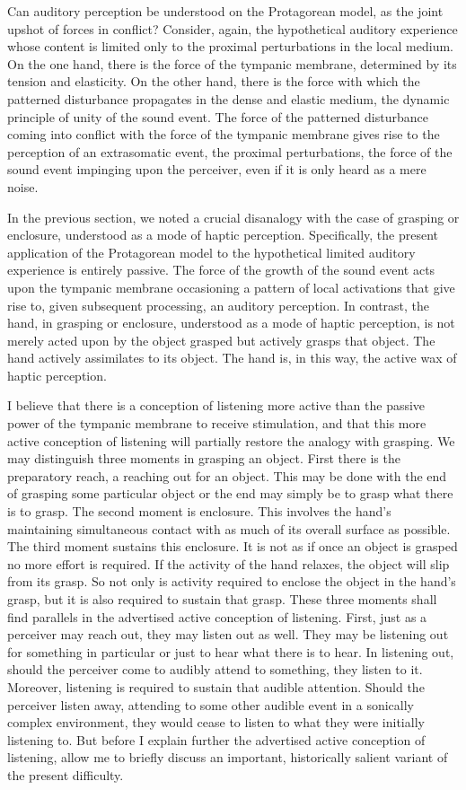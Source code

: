 Can auditory perception be understood on the Protagorean model, as the joint upshot of forces in conflict? Consider, again, the hypothetical auditory experience whose content is limited only to the proximal perturbations in the local medium. On the one hand, there is the force of the tympanic membrane, determined by its tension and elasticity. On the other hand, there is the force with which the patterned disturbance propagates in the dense and elastic medium, the dynamic principle of unity of the sound event. The force of the patterned disturbance coming into conflict with the force of the tympanic membrane gives rise to the perception of an extrasomatic event, the proximal perturbations, the force of the sound event impinging upon the perceiver, even if it is only heard as a mere noise.

In the previous section, we noted a crucial disanalogy with the case of grasping or enclosure, understood as a mode of haptic perception. Specifically, the present application of the Protagorean model to the hypothetical limited auditory experience is entirely passive. The force of the growth of the sound event acts upon the tympanic membrane occasioning a pattern of local activations that give rise to, given subsequent processing, an auditory perception. In contrast, the hand, in grasping or enclosure, understood as a mode of haptic perception, is not merely acted upon by the object grasped but actively grasps that object. The hand actively assimilates to its object. The hand is, in this way, the active wax of haptic perception.

I believe that there is a conception of listening more active than the passive power of the tympanic membrane to receive stimulation, and that this more active conception of listening will partially restore the analogy with grasping. We may distinguish three moments in grasping an object. First there is the preparatory reach, a reaching out for an object. This may be done with the end of grasping some particular object or the end may simply be to grasp what there is to grasp. The second moment is enclosure. This involves the hand's maintaining simultaneous contact with as much of its overall surface as possible. The third moment sustains this enclosure. It is not as if once an object is grasped no more effort is required. If the activity of the hand relaxes, the object will slip from its grasp. So not only is activity required to enclose the object in the hand's grasp, but it is also required to sustain that grasp. These three moments shall find parallels in the advertised active conception of listening. First, just as a perceiver may reach out, they may listen out as well. They may be listening out for something in particular or just to hear what there is to hear. In listening out, should the perceiver come to audibly attend to something, they listen to it. Moreover, listening is required to sustain that audible attention. Should the perceiver listen away, attending to some other audible event in a sonically complex environment, they would cease to listen to what they were initially listening to. But before I explain further the advertised active conception of listening, allow me to briefly discuss an important, historically salient variant of the present difficulty.

